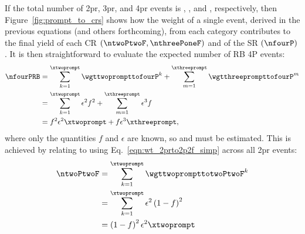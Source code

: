 If the total number of 2pr, 3pr, and 4pr events is \xtwoprompt, \xthreeprompt, and \xfourprompt, respectively, then Figure~\ref{fig:prompt_to_crs} shows how the weight of a single event, derived in the previous equations (and others forthcoming), from each category contributes to the final yield of each CR $\left( \ntwoPtwoF, \nthreePoneF \right)$ and of the SR $\left( \nfourP \right)$.
It is then straightforward to evaluate the expected number of RB 4P events:
\begin{align}
	\label{eqn:n4p_x2x3}
	\nfourPRB
	&= \sum_{k=1}^{\xtwoprompt} \wgttwoprompttofourP^k + \sum_{m=1}^{\xthreeprompt} \wgtthreeprompttofourP^m
	\notag
	\\
	&= \sum_{k=1}^{\xtwoprompt} \epsilon^2 f^2 + \sum_{m=1}^{\xthreeprompt} \epsilon^3 f
	\notag
	\\
	&= f^2 \epsilon^2 \xtwoprompt + f \epsilon^3 \xthreeprompt,
\end{align}
where only the quantities $f$ and $\epsilon$ are known, so \xtwoprompt and \xthreeprompt must be estimated.
This is achieved by relating \xtwoprompt to \ntwoPtwoF using Eq.~\ref{eqn:wt_2prto2p2f_simp} across all 2pr events:
\begin{align}
	\label{eqn:n2p2f_x2}
	\ntwoPtwoF
	&= \sum_{k=1}^{\xtwoprompt} \wgttwoprompttotwoPtwoF^k
	\notag
	\\
	&= \sum_{k=1}^{\xtwoprompt} \epsilon^2 \left( 1-f \right)^2
	\notag
	\\
	&= \left( 1-f \right)^2 \epsilon^2 \xtwoprompt
\end{align}


